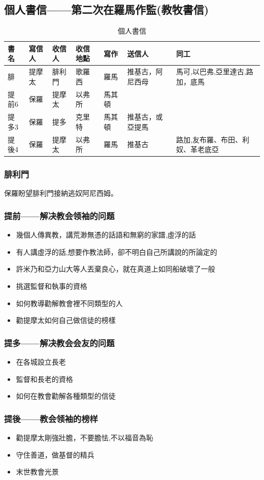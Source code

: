\subsection{個人書信——第二次在羅馬作監(教牧書信)}
\begin{table}[H]
\begin{tabularx}{17cm}{lllllll}%
\hline
書名 & 寫信人 &收信人&收信地點&寫作&送信人&同工\\ \hline
腓 & 提摩太 &腓利門 &歌羅西& 羅馬&推基古，阿尼西母&馬可,以巴弗,亞里達古,路加，底馬\\%
提前6 & 保羅 & 提摩太 &以弗所&馬其頓&&\\%
提多3 & 保羅 &提多&克里特&馬其頓&推基古，或亞提馬& \\%
提後4 & 保羅 & 提摩太 &以弗所&羅馬& 推基古& 路加,友布羅、布田、利奴、革老底亞\\\hline
\end{tabularx}
\caption{個人書信}
\end{table}


\subsubsection{腓利門}
保羅盼望腓利門接納逃奴阿尼西姆。

\subsubsection{提前——解决教会领袖的问题}
\begin{itemize}%
\itemsep-.25em 
\item 幾個人傳異教，講荒渺無憑的話語和無窮的家譜,虛浮的話 
\item 有人講虛浮的話,想要作教法師，卻不明白自己所講說的所論定的
\item 許米乃和亞力山大等人丟棄良心，就在真道上如同船破壞了一般 
\item 挑選監督和執事的資格 
\item 如何教導勸解教會裡不同類型的人
\item 勸提摩太如何自己做信徒的榜樣
\end{itemize}

\subsubsection{提多——解决教会会友的问题}
\begin{itemize}%
\itemsep-.25em 
\item 在各城設立長老 
\item 監督和長老的資格
\item 如何在教會勸解各種類型的信徒
\end{itemize}

\subsubsection{提後——教会领袖的榜样}
\begin{itemize}%
\itemsep-.25em 
\item 勸提摩太剛強壯膽，不要膽怯,不以福音為恥
\item 守住善道，做基督的精兵 
\item 末世教會光景
\end{itemize}


